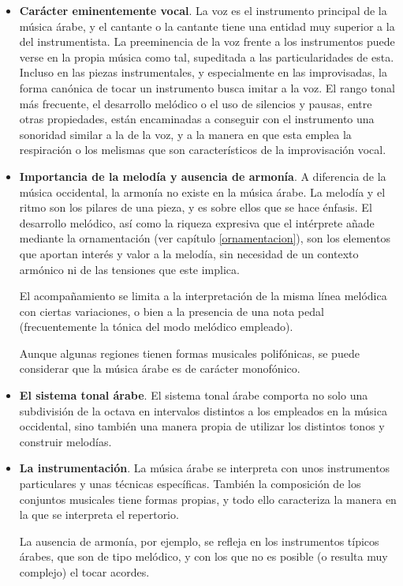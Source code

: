     \begin{itemize}
    \item \textbf{Carácter eminentemente vocal}. La voz es el instrumento principal de la música árabe, y el cantante o la cantante tiene una entidad muy superior a la del instrumentista. La preeminencia de la voz frente a los instrumentos puede verse en la propia música como tal, supeditada a las particularidades de esta. Incluso en las piezas instrumentales, y especialmente en las improvisadas, la forma canónica de tocar un instrumento busca imitar a la voz. El rango tonal más frecuente, el desarrollo melódico o el uso de silencios y pausas, entre otras propiedades, están encaminadas a conseguir con el instrumento una sonoridad similar a la de la voz, y a la manera en que esta emplea la respiración o los melismas que son característicos de la improvisación vocal.

    \item \textbf{Importancia de la melodía y ausencia de armonía}. A diferencia de la música occidental, la armonía no existe en la música árabe. La melodía y el ritmo son los pilares de una pieza, y es sobre ellos que se hace énfasis. El desarrollo melódico, así como la riqueza expresiva que el intérprete añade mediante la ornamentación (ver capítulo \ref{ornamentacion}), son los elementos que aportan interés y valor a la melodía, sin necesidad de un contexto armónico ni de las tensiones que este implica.

    El acompañamiento se limita a la interpretación de la misma línea melódica con ciertas variaciones, o bien a la presencia de una nota pedal (frecuentemente la tónica del modo melódico empleado).

    Aunque algunas regiones tienen formas musicales polifónicas, se puede considerar que la música árabe es de carácter monofónico.

    \item \textbf{El sistema tonal árabe}. El sistema tonal árabe comporta no solo una subdivisión de la octava en intervalos distintos a los empleados en la música occidental, sino también una manera propia de utilizar los distintos tonos y construir melodías.

    \item \textbf{La instrumentación}. La música árabe se interpreta con unos instrumentos particulares y unas técnicas específicas. También la composición de los conjuntos musicales tiene formas propias, y todo ello caracteriza la manera en la que se interpreta el repertorio.

    La ausencia de armonía, por ejemplo, se refleja en los instrumentos típicos árabes, que son de tipo melódico, y con los que no es posible (o resulta muy complejo) el tocar acordes.
    \end{itemize}


